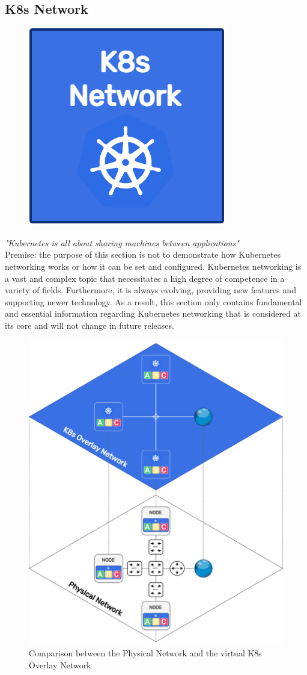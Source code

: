 \subsection{K8s Network}
\label{subsec:architecture_network_k8s_network}

\begin{figure}
  \centering
  \includegraphics[width=.2\textwidth]{images/architecture/k8s_network.png}
\end{figure}

\textit{"Kubernetes is all about sharing machines between applications"}\cite{k8s_cluster_networking}
\\ %

Premise: the purpose of this section is not to demonstrate how Kubernetes networking
works or how it can be set and configured. Kubernetes networking is a vast and
complex topic that necessitates a high degree of competence in a variety of
fields. Furthermore, it is always evolving, providing new features and supporting
newer technology. As a result, this section only contains fundamental and essential
information regarding Kubernetes networking that is considered at its core and will
not change in future releases.

\begin{figure}
  \centering
  \includegraphics[width=.5\textwidth]{images/architecture/overlay_network.png}
  \caption{Comparison
  between
  the
  Physical
  Network
  and
  the
  virtual
  K8s
  Overlay
  Network}
  \label{fig:overlay_network}
\end{figure}

